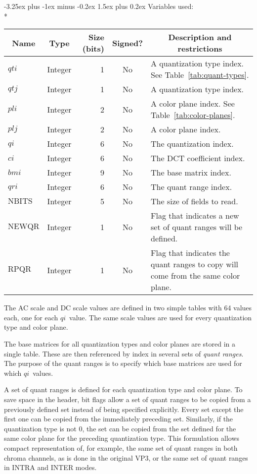 \documentclass[9pt,letterpaper]{book}
\makeatletter
\newcommand{\idx}[1]{{\ensuremath{\mathit{#1}}}}
\newcommand{\qti}{\idx{qti}}
\newcommand{\qtj}{\idx{qtj}}
\newcommand{\pli}{\idx{pli}}
\newcommand{\plj}{\idx{plj}}
\newcommand{\qi}{\idx{qi}}
\newcommand{\ci}{\idx{ci}}
\newcommand{\bmi}{\idx{bmi}}
\newcommand{\qri}{\idx{qri}}
\newcommand{\locvar}[1]{\ensuremath{\mathrm{#1}}}
\newcommand{\term}[1]{{\em #1}}
\numberwithin{equation}{chapter}
\numberwithin{figure}{chapter}
\numberwithin{table}{chapter}
\renewcommand{\paragraph}{\@startsection{paragraph}{4}{0ex}%
 {-3.25ex plus -1ex minus -0.2ex}%
 {1.5ex plus 0.2ex}%
 {\normalfont\normalsize\bfseries}}
\makeatother
\begin{document}
\paragraph{Variables used:}\hfill\\*
\begin{tabularx}{\textwidth}{@{}llrcX@{}}\toprule
\multicolumn{1}{c}{Name} &
\multicolumn{1}{c}{Type} &
\multicolumn{1}{p{30pt}}{\centering Size (bits)} &
\multicolumn{1}{c}{Signed?} &
\multicolumn{1}{c}{Description and restrictions} \\\midrule\endhead
\locvar{\qti}    & Integer &  1 & No & A quantization type index.
See Table~\ref{tab:quant-types}.\\
\locvar{\qtj}    & Integer &  1 & No & A quantization type index. \\
\locvar{\pli}    & Integer &  2 & No & A color plane index.
See Table~\ref{tab:color-planes}.\\
\locvar{\plj}    & Integer &  2 & No & A color plane index. \\
\locvar{\qi}     & Integer &  6 & No & The quantization index. \\
\locvar{\ci}     & Integer &  6 & No & The DCT coefficient index. \\
\locvar{\bmi}    & Integer &  9 & No & The base matrix index. \\
\locvar{\qri}    & Integer &  6 & No & The quant range index. \\
\locvar{NBITS}   & Integer &  5 & No & The size of fields to read. \\
\locvar{NEWQR}   & Integer &  1 & No & Flag that indicates a new set of quant
 ranges will be defined. \\
\locvar{RPQR}    & Integer &  1 & No & Flag that indicates the quant ranges to
 copy will come from the same color plane. \\
\bottomrule\end{tabularx}
\medskip

The AC scale and DC scale values are defined in two simple tables with 64
 values each, one for each \qi\ value.
The same scale values are used for every quantization type and color plane.

The base matrices for all quantization types and color planes are stored in a
 single table.
These are then referenced by index in several sets of \term{quant ranges}.
The purpose of the quant ranges is to specify which base matrices are used for
 which \qi\ values.

A set of quant ranges is defined for each quantization type and color plane.
To save space in the header, bit flags allow a set of quant ranges to be copied
 from a previously defined set instead of being specified explicitly.
Every set except the first one can be copied from the immediately preceding
 set.
Similarly, if the quantization type is not $0$, the set can be copied from the
 set defined for the same color plane for the preceding quantization type.
This formulation allows compact representation of, for example, the same 
 set of quant ranges in both chroma channels, as is done in the original VP3,
 or the same set of quant ranges in INTRA and INTER modes.
\end{document}
